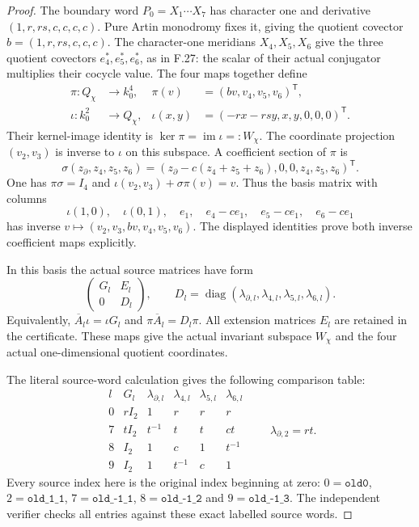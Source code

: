 \begin{proof}
The boundary word $P_0=X_1\cdots X_7$ has
character one and derivative
$(1,r,rs,c,c,c,c)$. Pure Artin monodromy fixes
it, giving the quotient covector
$b=(1,r,rs,c,c,c)$.
The character-one meridians $X_4,X_5,X_6$ give
the three quotient covectors $e_4^*,e_5^*,e_6^*$,
as in F.27: the scalar of their actual conjugator
multiplies their cocycle value.
The four maps together define
\[
 \begin{aligned}
 \pi:Q_\chi&\longrightarrow k_0^4,
       &\pi(v)&=(bv,v_4,v_5,v_6)^{\mathsf T},\\
 \iota:k_0^2&\longrightarrow Q_\chi,
       &\iota(x,y)&=(-rx-rsy,x,y,0,0,0)^{\mathsf T}.
 \end{aligned}                                                \tag{F.28.6}
\]
Their kernel-image identity is
$\ker\pi=\operatorname{im}\iota=:W_\chi$.
The coordinate projection $(v_2,v_3)$ is inverse
to $\iota$ on this subspace. A coefficient section
of $\pi$ is
\[
 \sigma(z_\partial,z_4,z_5,z_6)
       =(z_\partial-c(z_4+z_5+z_6),0,0,z_4,z_5,z_6)^{\mathsf T}.
                                                               \tag{F.28.7}
\]
One has $\pi\sigma=I_4$ and
$\iota(v_2,v_3)+\sigma\pi(v)=v$.
Thus the basis matrix with columns
\[
 \iota(1,0),\quad\iota(0,1),\quad e_1,
             \quad e_4-ce_1,\quad e_5-ce_1,\quad e_6-ce_1
                                                               \tag{F.28.8}
\]
has inverse $v\mapsto(v_2,v_3,bv,v_4,v_5,v_6)$.
The displayed identities prove both inverse
coefficient maps explicitly.

In this basis the actual source matrices have form
\[
 \begin{pmatrix}G_l&E_l\\0&D_l\end{pmatrix},\qquad
 D_l=\operatorname{diag}
  (\lambda_{\partial,l},\lambda_{4,l},
                         \lambda_{5,l},\lambda_{6,l}).
                                                               \tag{F.28.9}
\]
Equivalently,
$\overline A_l\iota=\iota G_l$ and
$\pi\overline A_l=D_l\pi$.
All extension matrices $E_l$ are retained in
the certificate. These maps give the actual
invariant subspace $W_\chi$ and the four actual
one-dimensional quotient coordinates.

The literal source-word calculation gives the
following comparison table:
\[
 \begin{array}{c|c|cccc}
 l&G_l&\lambda_{\partial,l}&\lambda_{4,l}
                         &\lambda_{5,l}&\lambda_{6,l}\\\hline
 0&rI_2&1&r&r&r\\
 7&tI_2&t^{-1}&t&t&ct\\
 8&I_2&1&c&1&t^{-1}\\
 9&I_2&1&t^{-1}&c&1
 \end{array}
 \qquad \lambda_{\partial,2}=rt.
                                                               \tag{F.28.10}
\]
Every source index here is the original index
beginning at zero: $0=\texttt{old0}$,
$2=\texttt{old\_1\_1}$,
$7=\texttt{old\_-1\_1}$,
$8=\texttt{old\_-1\_2}$ and
$9=\texttt{old\_-1\_3}$.
The independent verifier checks all entries
against these exact labelled source words.


\end{proof}
